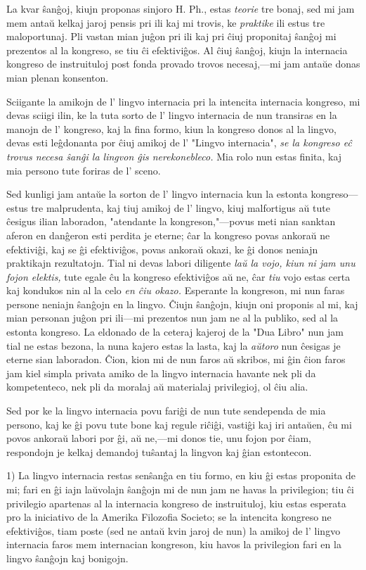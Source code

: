 \documentclass[12pt,twoside]{book}
\begin{document}
La kvar ŝanĝoj, kiujn proponas sinjoro H. Ph., estas \emph{teorie} tre bonaj, sed mi jam mem antaŭ kelkaj jaroj pensis pri ili kaj mi trovis, ke \emph{praktike} ili estus tre maloportunaj. Pli vastan mian juĝon pri ili kaj pri ĉiuj proponitaj ŝanĝoj mi prezentos al la kongreso, se tiu ĉi efektiviĝos. Al ĉiuj ŝanĝoj, kiujn la internacia kongreso de instruituloj post fonda provado trovos necesaj,—mi jam antaŭe donas mian plenan konsenton.

Sciigante la amikojn de l' lingvo internacia pri la intencita internacia kongreso, mi devas sciigi ilin, ke la tuta sorto de l' lingvo internacia de nun transiras en la manojn de l' kongreso, kaj la fina formo, kiun la kongreso donos al la lingvo, devas esti leĝdonanta por ĉiuj amikoj de l' "Lingvo internacia", \emph{se la kongreso eĉ trovus necesa ŝanĝi la lingvon ĝis nerekonebleco.} Mia rolo nun estas finita, kaj mia persono tute foriras de l' sceno.

Sed kunligi jam antaŭe la sorton de l' lingvo internacia kun la estonta kongreso—estus tre malprudenta, kaj tiuj amikoj de l' lingvo, kiuj malfortigus aŭ tute ĉesigus ilian laboradon, "atendante la kongreson,"—povus meti nian sanktan aferon en danĝeron esti perdita je eterne; ĉar la kongreso povas ankoraŭ ne efektiviĝi, kaj se ĝi efektiviĝos, povas ankoraŭ okazi, ke ĝi donos neniajn praktikajn rezultatojn. Tial ni devas labori diligente \emph{laŭ la vojo, kiun ni jam unu fojon elektis,} tute egale ĉu la kongreso efektiviĝos aŭ ne, ĉar \emph{tiu} vojo estas certa kaj kondukos nin al la celo \emph{en ĉiu okazo.} Esperante la kongreson, mi nun faras persone neniajn ŝanĝojn en la lingvo. Ĉiujn ŝanĝojn, kiujn oni proponis al mi, kaj mian personan juĝon pri ili—mi prezentos nun jam ne al la publiko, sed al la estonta kongreso. La eldonado de la ceteraj kajeroj de la "Dua Libro" nun jam tial ne estas bezona, la nuna kajero estas la lasta, kaj la \emph{aŭtoro} nun ĉesigas je eterne sian laboradon. Ĉion, kion mi de nun faros aŭ skribos, mi ĝin ĉion faros jam kiel simpla privata amiko de la lingvo internacia havante nek pli da kompetenteco, nek pli da moralaj aŭ materialaj privilegioj, ol ĉiu alia.

Sed por ke la lingvo internacia povu fariĝi de nun tute sendependa de mia persono, kaj ke ĝi povu tute bone kaj regule riĉiĝi, vastiĝi kaj iri antaŭen, ĉu mi povos ankoraŭ labori por ĝi, aŭ ne,—mi donos tie, unu fojon por ĉiam, respondojn je kelkaj demandoj tuŝantaj la lingvon kaj ĝian estontecon.

1) La lingvo internacia restas senŝanĝa en tiu formo, en kiu ĝi estas proponita de mi; fari en ĝi iajn laŭvolajn ŝanĝojn mi de nun jam ne havas la privilegion; tiu ĉi privilegio apartenas al la internacia kongreso de instruituloj, kiu estas esperata pro la iniciativo de la Amerika Filozofia Societo; se la intencita kongreso ne efektiviĝos, tiam poste (sed ne antaŭ kvin jaroj de nun) la amikoj de l' lingvo internacia faros mem internacian kongreson, kiu havos la privilegion fari en la lingvo ŝanĝojn kaj bonigojn.
\end{document}
